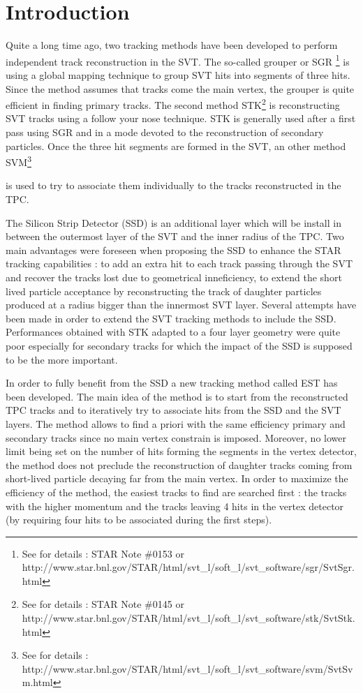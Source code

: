 \documentclass[twoside]{article}
\begin{document}
\section{Introduction}
Quite a long time ago, two tracking methods have been developed to
perform independent track reconstruction in the SVT. The so-called
grouper or SGR
\footnote{See for details : STAR Note \#0153 or 
http://www.star.bnl.gov/STAR/html/svt\_{}l/soft\_{}l/svt\_{}software/sgr/SvtSgr.html}
is using a global mapping technique to group SVT hits into segments of
three hits. Since the method assumes that tracks come the main vertex,
the grouper is quite efficient in finding primary tracks. The second
method STK\footnote{See for details : STAR Note \#0145 or
http://www.star.bnl.gov/STAR/html/svt\_{}l/soft\_{}l/svt\_{}software/stk/SvtStk.html}
is reconstructing SVT tracks using a follow your nose technique.  STK
is generally used after a first pass using SGR and in a mode devoted
to the reconstruction of secondary particles. Once the three hit
segments are formed in the SVT, an other method SVM\footnote{See for details :
http://www.star.bnl.gov/STAR/html/svt\_{}l/soft\_{}l/svt\_{}software/svm/SvtSvm.html}

 is used to try to
associate them individually to the tracks reconstructed in the TPC.

The Silicon Strip Detector (SSD) is an additional layer which will be
install in between the outermost layer of the SVT and the inner radius
of the TPC. Two main advantages were foreseen when proposing the SSD
to enhance the STAR tracking capabilities : to add an extra hit to
each track passing through the SVT and recover the tracks lost due to
geometrical inneficiency, to extend the short lived particle
acceptance by reconstructing the track of daughter particles produced
at a radius bigger than the innermost SVT layer. Several attempts have
been made in order to extend the SVT tracking methods to include the
SSD. Performances obtained with STK adapted to a four layer geometry
were quite poor especially for secondary tracks for which the impact
of the SSD is supposed to be the more important. 
 
In order to fully benefit from the SSD a new tracking method called
EST has been developed. The main idea of the method is to start from
the reconstructed TPC tracks and to iteratively try to associate hits
from the SSD and the SVT layers. The method allows to find a priori
with the same efficiency primary and secondary tracks since no main
vertex constrain is imposed. Moreover, no lower limit being set on the
number of hits forming the segments in the vertex detector, the method
does not preclude the reconstruction of daughter tracks coming from
short-lived particle decaying far from the main vertex. In order to
maximize the efficiency of the method, the easiest tracks to find are
searched first : the tracks with the higher momentum and the tracks
leaving 4 hits in the vertex detector (by requiring four hits to be
associated during the first steps).
\end{document}
